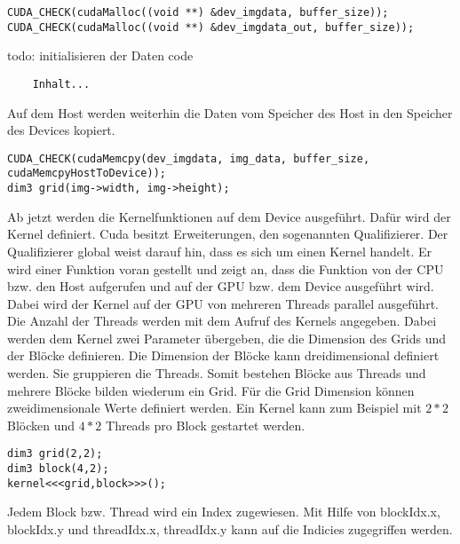 \documentclass{llncs}
\begin{document}
\begin{lstlisting}
CUDA_CHECK(cudaMalloc((void **) &dev_imgdata, buffer_size));
CUDA_CHECK(cudaMalloc((void **) &dev_imgdata_out, buffer_size));
\end{lstlisting}

todo: initialisieren der Daten code\\

\begin{lstlisting}
	Inhalt...
\end{lstlisting}

Auf dem Host werden weiterhin die Daten vom Speicher des Host in den Speicher des Devices kopiert.\\ 

\begin{lstlisting}[]
CUDA_CHECK(cudaMemcpy(dev_imgdata, img_data, buffer_size, cudaMemcpyHostToDevice));
dim3 grid(img->width, img->height);
\end{lstlisting}

Ab jetzt werden die Kernelfunktionen auf dem Device ausgeführt. Dafür wird der Kernel definiert. Cuda besitzt Erweiterungen, den sogenannten Qualifizierer. Der Qualifizierer \textunderscore\textunderscore global \textunderscore\textunderscore weist darauf hin, dass es sich um einen Kernel handelt. Er wird einer Funktion voran gestellt und zeigt an, dass die Funktion von der CPU bzw. den Host aufgerufen und auf der GPU bzw. dem Device ausgeführt wird. Dabei wird der Kernel auf der GPU von mehreren Threads parallel ausgeführt. Die Anzahl der Threads werden mit dem Aufruf des Kernels angegeben. Dabei werden dem Kernel zwei Parameter übergeben, die die Dimension des Grids und der Blöcke definieren. Die Dimension der Blöcke kann dreidimensional definiert werden. Sie gruppieren die Threads. Somit bestehen Blöcke aus Threads und mehrere Blöcke bilden wiederum ein Grid. Für die Grid Dimension können zweidimensionale Werte definiert werden. Ein Kernel kann zum Beispiel mit $2 * 2$ Blöcken und $4 * 2$ Threads pro Block gestartet werden.\\

\begin{lstlisting}
dim3 grid(2,2);
dim3 block(4,2);
kernel<<<grid,block>>>();
\end{lstlisting}

Jedem Block bzw. Thread wird ein Index zugewiesen. Mit Hilfe von blockIdx.x, blockIdx.y und threadIdx.x, threadIdx.y kann auf die Indicies zugegriffen werden.\\
\end{document}
